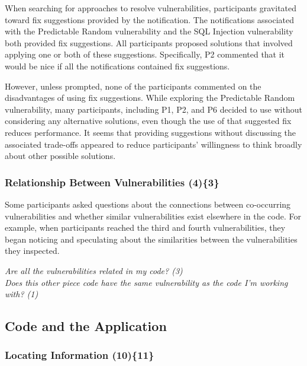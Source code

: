 \documentclass{acm_proc_article-sp}
\begin{document}
 
When searching for approaches to resolve vulnerabilities, participants gravitated toward fix suggestions provided by the notification.
The notifications associated with the Predictable Random vulnerability and the SQL Injection vulnerability both provided fix suggestions.
All participants proposed solutions that involved applying one or both of these suggestions. 
Specifically, P2 commented that it would be nice if all the notifications contained fix suggestions.

However, unless prompted, none of the participants commented on the disadvantages of using fix suggestions.
While exploring the Predictable Random vulnerability, many participants, including P1, P2, and P6 decided to use  without considering any alternative solutions, even though the use of that suggested fix reduces performance.
It seems that providing suggestions without discussing the associated trade-offs appeared to reduce participants' willingness to think broadly about other possible solutions. 



\subsubsection{\textbf{Relationship Between Vulnerabilities (4)\{3\}}}\label{rbb}

Some participants asked questions about the connections between co-occurring vulnerabilities and whether similar vulnerabilities exist elsewhere in the code. 
For example, when participants reached the third and fourth vulnerabilities, they began noticing and speculating about the similarities between the vulnerabilities they inspected.


\noindent\emph{Are all the vulnerabilities related in my code? (3)} \\
\emph{Does this other piece code have the same vulnerability as the code I'm working with? (1)} 



\subsection{Code and the Application}
\label{sec:results-ca}



\subsubsection{\textbf{Locating Information (10)\{11\}}}\label{li}
\end{document}
